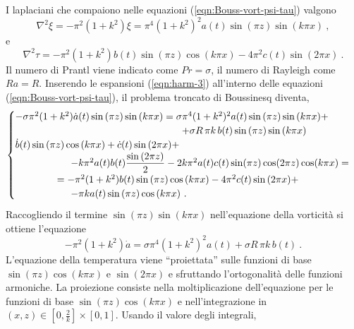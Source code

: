 %
I laplaciani che compaiono nelle equazioni (\ref{eqn:Bouss-vort-psi-tau}) valgono
\begin{equation}
    \nabla^2 \xi = -\pi^2 (1+k^2) \xi = \pi^4 (1+k^2)^2 a(t) \sin{(\pi z)} \sin{(k \pi x)} \ , 
\end{equation}
e
\begin{equation}
    \nabla^2 \tau = -\pi^2 (1+k^2) b(t) \sin{(\pi z)}\cos{(k \pi x)} - 4 \pi^2 c(t) \sin{(2\pi x)} \ .
\end{equation}
%
Il numero di Prantl viene indicato come $Pr = \sigma$, il numero di Rayleigh come $Ra = R$.
Inserendo le espansioni (\ref{eqn:harm-3}) all'interno delle equazioni (\ref{eqn:Bouss-vort-psi-tau}), il problema troncato di Boussinesq diventa,
\begin{equation}
    \begin{cases}
- \sigma \pi^2 (1+k^2) \dot{a}(t) \sin{(\pi z)} \sin{(k\pi x )} = \sigma \pi^4 (1+k^2)^2 a(t) \sin{(\pi z)} \sin{(k \pi x)} + \\
      \hspace{6.0cm} + \sigma R \, \pi k \, b(t) \sin{(\pi z)}\sin{(k \pi x)} \\
     \dot{b}(t)\sin{(\pi z)} \cos{(k\pi x )} + \dot{c}(t) \sin{(2\pi x)} + \\
     \hspace{2.0cm} - k \pi^2 a(t) b(t) \dfrac{\sin{(2 \pi z)}}{2} -
    2 k \pi^2 a(t)c(t) \sin(\pi z) \cos(2\pi z) \cos(k \pi x) = \\ 
    \hspace{1.5cm} = -\pi^2 (1+k^2) b(t) \sin{(\pi z)}\cos{(k \pi x)} - 4 \pi^2 c(t) \sin{(2\pi x)} + \\
    \hspace{2.0cm} - \pi k a(t) \sin{(\pi z)} \cos{(k \pi x)} \ .
    \end{cases}
\end{equation}
Raccogliendo il termine $\sin{(\pi z)} \sin{(k \pi x)}$ nell'equazione della vorticità si ottiene l'equazione
\begin{equation}
    - \pi^2 (1+k^2) \dot{a} = \sigma \pi^4 (1+k^2)^2 a(t) +  \sigma R \, \pi k \, b(t) \ .
\end{equation}
L'equazione della temperatura viene ``proiettata'' sulle funzioni di base $\sin{(\pi z)} \cos{(k \pi x)}$ e $\sin{(2 \pi x)}$ e sfruttando l'ortogonalità delle funzioni armoniche.
La proiezione consiste nella moltiplicazione dell'equazione per le funzioni di base $\sin{(\pi z)} \cos{(k \pi x)}$ e nell'integrazione in $(x,z) \in \left[0,\frac{2}{k}\right]\times\left[0,1\right]$. Usando il valore degli integrali,
